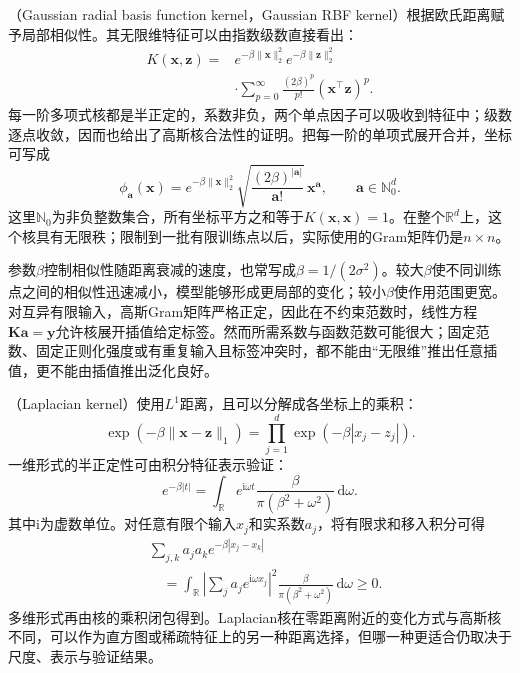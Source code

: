 （Gaussian radial basis function kernel，Gaussian RBF kernel）根据欧氏距离赋予局部相似性。其无限维特征可以由指数级数直接看出：
\begin{equation}
  \begin{aligned}
    K(\bm{x},\bm{z})
      ={}&e^{-\beta\lVert\bm{x}\rVert_2^2}
          e^{-\beta\lVert\bm{z}\rVert_2^2}\\
       &\cdot\sum_{p=0}^{\infty}
          \frac{(2\beta)^p}{p!}
          (\bm{x}^{\top}\bm{z})^p.
  \end{aligned}
  \label{eq:classification-svm-rbf-expansion}
\end{equation}
每一阶多项式核都是半正定的，系数非负，两个单点因子可以吸收到特征中；级数逐点收敛，因而也给出了高斯核合法性的证明。把每一阶的单项式展开合并，坐标可写成
\[
  \phi_{\bm{a}}(\bm{x})
  =e^{-\beta\lVert\bm{x}\rVert_2^2}
     \sqrt{\frac{(2\beta)^{|\bm{a}|}}{\bm{a}!}}\,
     \bm{x}^{\bm{a}},
  \qquad \bm{a}\in\mathbb{N}_0^d.
\]
这里$\mathbb{N}_0$为非负整数集合，所有坐标平方之和等于$K(\bm{x},\bm{x})=1$。在整个$\mathbb{R}^d$上，这个核具有无限秩；限制到一批有限训练点以后，实际使用的Gram矩阵仍是$n\times n$。

参数$\beta$控制相似性随距离衰减的速度，也常写成$\beta=1/(2\sigma^2)$。较大$\beta$使不同训练点之间的相似性迅速减小，模型能够形成更局部的变化；较小$\beta$使作用范围更宽。对互异有限输入，高斯Gram矩阵严格正定，因此在不约束范数时，线性方程$\bm{K}\bm{a}=\bm{y}$允许核展开插值给定标签。然而所需系数与函数范数可能很大；固定范数、固定正则化强度或有重复输入且标签冲突时，都不能由“无限维”推出任意插值，更不能由插值推出泛化良好。

（Laplacian kernel）使用$L^1$距离，且可以分解成各坐标上的乘积：
\[
  \exp(-\beta\lVert\bm{x}-\bm{z}\rVert_1)
  =\prod_{j=1}^d\exp(-\beta|x_j-z_j|).
\]
一维形式的半正定性可由积分特征表示验证：
\[
  e^{-\beta|t|}
  =\int_{\mathbb{R}}e^{\mathrm{i}\omega t}
      \frac{\beta}{\pi(\beta^2+\omega^2)}\,\mathrm{d}\omega.
\]
其中$\mathrm{i}$为虚数单位。对任意有限个输入$x_j$和实系数$a_j$，将有限求和移入积分可得
\[
  \begin{aligned}
    &\sum_{j,k}a_j a_k e^{-\beta|x_j-x_k|}\\
    &\quad=\int_{\mathbb{R}}
      \left|\sum_j a_j e^{\mathrm{i}\omega x_j}\right|^2
      \frac{\beta}{\pi(\beta^2+\omega^2)}\,\mathrm{d}\omega
      \ge0.
  \end{aligned}
\]
多维形式再由核的乘积闭包得到。Laplacian核在零距离附近的变化方式与高斯核不同，可以作为直方图或稀疏特征上的另一种距离选择，但哪一种更适合仍取决于尺度、表示与验证结果。

